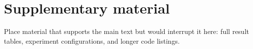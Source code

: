 \chapter{Supplementary material}
Place material that supports the main text but would interrupt it here: full result tables, experiment configurations, and longer code listings.



